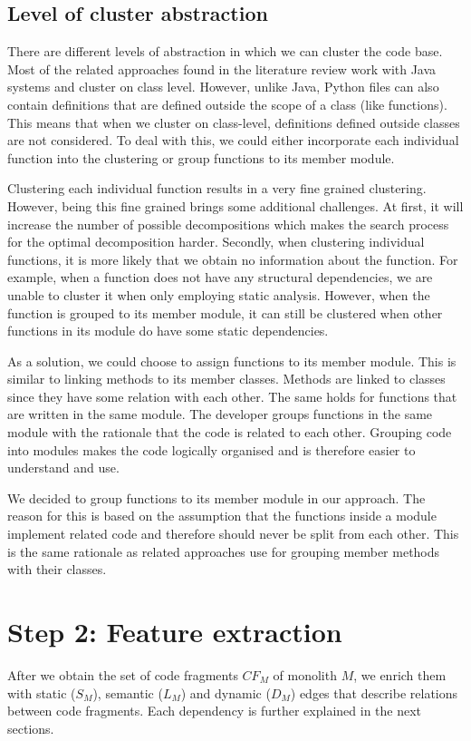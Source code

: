 \subsection{Level of cluster abstraction}\label{ss:level_of_cluster_abstraction}
There are different levels of abstraction in which we can cluster the code base. Most of the related approaches found in the literature review work with Java systems and cluster on class level. However, unlike Java, Python files can also contain definitions that are defined outside the scope of a class (like functions). This means that when we cluster on class-level, definitions defined outside classes are not considered. To deal with this, we could either incorporate each individual function into the clustering or group functions to its member module. \par
Clustering each individual function results in a very fine grained clustering. However, being this fine grained brings some additional challenges. At first, it will increase the number of possible decompositions which makes the search process for the optimal decomposition harder. Secondly, when clustering individual functions, it is more likely that we obtain no information about the function. For example, when a function does not have any structural dependencies, we are unable to cluster it when only employing static analysis. However, when the function is grouped to its member module, it can still be clustered when other functions in its module do have some static dependencies. \par
As a solution, we could choose to assign functions to its member module. This is similar to linking methods to its member classes. Methods are linked to classes since they have some relation with each other. The same holds for functions that are written in the same module. The developer groups functions in the same module with the rationale that the code is related to each other. Grouping code into modules makes the code logically organised and is therefore easier to understand and use. \par
We decided to group functions to its member module in our approach. The reason for this is based on the assumption that the functions inside a module implement related code and therefore should never be split from each other. This is the same rationale as related approaches use for grouping member methods with their classes. 

\section{Step 2: Feature extraction}\label{s:step2_features}
After we obtain the set of code fragments $CF_M$ of monolith $M$, we enrich them with static ($S_M$), semantic ($L_M$) and dynamic ($D_M$) edges that describe relations between code fragments. Each dependency is further explained in the next sections.

